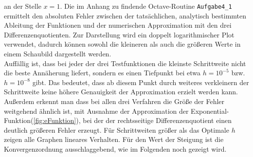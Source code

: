 an der Stelle $x=1$. Die im Anhang zu findende Octave-Routine \texttt{Aufgabe4\_1} ermittelt den absoluten Fehler zwischen der tatsächlichen, analytisch bestimmten Ableitung der Funktionen und der numerischen Approximation mit den drei Differenzenquotienten. Zur Darstellung wird ein doppelt logarithmischer Plot verwendet, dadurch können sowohl die kleineren als auch die größeren Werte in einem Schaubild dargestellt werden.\\
Auffällig ist, dass bei jeder der drei Testfunktionen die kleinste Schrittweite nicht die beste Annäherung liefert, sondern es einen Tiefpunkt bei etwa $h=10^{-5}$ bzw. $h=10^{-8}$ gibt. Das bedeutet, dass ab diesem Punkt durch weiteres verkleinern der Schrittweite keine höhere Genauigkeit der Approximation erzielt werden kann. Außerdem erkennt man dass bei allen drei Verfahren die Größe der Fehler weitgehend ähnlich ist, mit Ausnahme der Approximation der Exponential-Funktion(\ref{fig:eFunktion}), bei der der rechtsseitige Differenzenquotient einen deutlich größeren Fehler erzeugt. 
Für Schrittweiten größer als das Optimale $h$ zeigen alle Graphen lineares Verhalten. Für den Wert der Steigung ist die Konvergenzordnung ausschlaggebend, wie im Folgenden noch gezeigt wird. 
